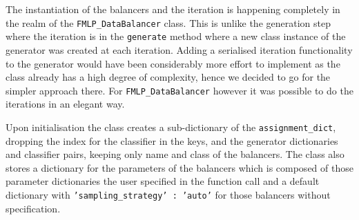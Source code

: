 The instantiation of the balancers and the iteration is happening completely in the realm of the \texttt{FMLP\_DataBalancer} class. 
This is unlike the generation step where the iteration is in the \texttt{generate} method where a new class instance of the generator was created at each iteration.
Adding a serialised iteration functionality to the generator would have been considerably more effort to implement as the class already has a high degree of complexity,
hence we decided to go for the simpler approach there. For \texttt{FMLP\_DataBalancer} however it was possible to do the iterations in an elegant way.

Upon initialisation the class creates a sub-dictionary of the \texttt{assignment\_dict}, dropping the index for the classifier in the keys,
and the generator dictionaries and classifier pairs, keeping only name and class of the balancers.
The class also stores a dictionary for the parameters of the balancers which is composed of those parameter dictionaries the user specified in the function call
and a default dictionary with \texttt{'sampling\_strategy' : 'auto'} for those balancers without specification.

